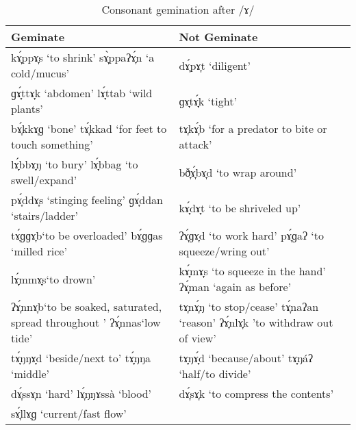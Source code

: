 \begin{table}
\caption{Consonant gemination after /ɤ/}
\label{tab2.3}
\begin{tabularx}{\textwidth}{QQ}
\lsptoprule 
Geminate & Not Geminate \\
\midrule
{}kɤ̞́ppɤ̞s ‘to shrink’
\newline
{}sɤ̞̀ppaʔɤ̞́n ‘a cold/mucus’ & 
{}dɤ̞́pɤ̞t ‘diligent’ \\
\tablevspace
{}ɡɤ̞́ttɤ̞k ‘abdomen’
\newline
{}lɤ̞́ttab ‘wild plants’&
{}ɡɤ̞tɤ̞́k ‘tight’ \\
\tablevspace
{}bɤ̞́kkɤ̞ɡ ‘bone’
\newline
{}tɤ̞́kkad ‘for feet to touch something' & 
{}tɤ̞kɤ̞́b ‘for a predator to bite or attack’ \\
\tablevspace
{}lɤ̞́bbɤ̞ŋ ‘to bury’
\newline
lɤ̞́bbag  ‘to swell/expand’ &
{}bð̞ɤ̞́bɤ̞d ‘to wrap around’ \\
\tablevspace
{}pɤ̞́ddɤ̞s ‘stinging feeling’
\newline
{}ɡɤ̞́ddan ‘stairs/ladder’ &
{}kɤ̞́dɤ̞t ‘to be shriveled up’ \\
\tablevspace
{}tɤ̞́ɡɡɤ̞b‘to be overloaded’
\newline
{}bɤ̞́ɡɡas ‘milled rice’ & 
ʔɤ̞́ɡɤ̞d ‘to work hard’
\newline
{}pɤ̞́ɡaʔ ‘to squeeze/wring out’ \\
\tablevspace
{}lɤ̞́mmɤ̞s‘to drown’ & 
{}kɤ̞́mɤ̞s ‘to squeeze in the hand’
\newline
{}ʔɤ̞́man ‘again as before’ \\
\tablevspace
{}ʔɤ̞́nnɤ̞b‘to be soaked, saturated, spread throughout ’
\newline
{}ʔɤ̞́nnas‘low tide’ &
tɤ̞nɤ̞́ŋ ‘to stop/cease’
\newline
{}tɤ̞́naʔan ‘reason’
\newline
{}ʔɤ̞́nlɤ̞k ’to withdraw out of view’ \\
\tablevspace
{}tɤ̞́ŋŋɤ̞d ‘beside/next to’
\newline
{}tɤ̞́ŋŋa ‘middle’ & 
tɤ̞ŋɤ̞́d ‘because/about’
\newline
{}tɤ̞ŋáʔ ‘half/to divide’ \\
\tablevspace
{}dɤ̞́ssɤ̞n ‘hard’
\newline
{}lɤ̞́ŋŋɤssà ‘blood’ & 
dɤ̞́sɤ̞k ‘to compress the contents’ \\
\tablevspace
{}sɤ̞́llɤ̞ɡ ‘current/fast flow’
\newline

\end{tabularx}
\end{table}
